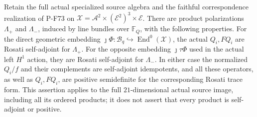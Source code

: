 \begin{corollary}
Retain the full actual specialized source algebra and the
faithful correspondence realization of P-F73 on
$\mathcal X=\mathcal A^2\times(\mathcal E^2)^3\times\mathcal E$.
There are product polarizations $\Lambda_+$ and $\Lambda_-$,
induced by line bundles over $\mathbb F_Q$, with the following
properties.  For the direct geometric embedding
$\jmath\Phi:\mathcal B_q\hookrightarrow\operatorname{End}^0(\mathcal X)$,
the actual $Q_i,FQ_i$ are Rosati self-adjoint for $\Lambda_+$.
For the opposite embedding $\jmath\tau\Phi$ used in the
actual left $H^1$ action, they are Rosati self-adjoint for
$\Lambda_-$.  In either case the normalized $Q_i/f$ and
their complements are self-adjoint idempotents, and all
these operators, as well as $Q_i,FQ_i$, are positive
semidefinite for the corresponding Rosati trace form.
This assertion applies to the full $21$-dimensional actual
source image, including all its ordered products; it does
not assert that every product is self-adjoint or positive.
\end{corollary}

